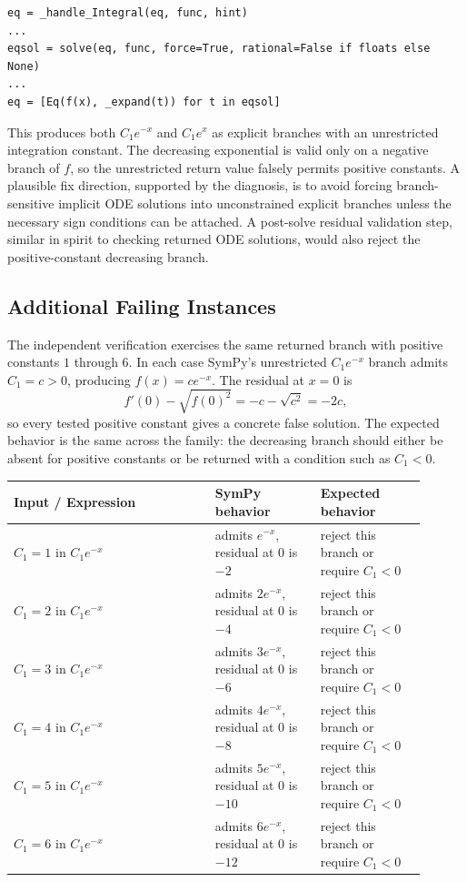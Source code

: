 \documentclass[11pt]{article}
\begin{document}
\begin{lstlisting}[style=bugpython]
eq = _handle_Integral(eq, func, hint)
...
eqsol = solve(eq, func, force=True, rational=False if floats else None)
...
eq = [Eq(f(x), _expand(t)) for t in eqsol]
\end{lstlisting}

This produces both \(C_1 e^{-x}\) and \(C_1 e^x\) as explicit branches with an
unrestricted integration constant.  The decreasing exponential is valid only on
a negative branch of \(f\), so the unrestricted return value falsely permits
positive constants.  A plausible fix direction, supported by the diagnosis, is
to avoid forcing branch-sensitive implicit ODE solutions into unconstrained
explicit branches unless the necessary sign conditions can be attached.  A
post-solve residual validation step, similar in spirit to checking returned ODE
solutions, would also reject the positive-constant decreasing branch.

\subsection{Additional Failing Instances}

The independent verification exercises the same returned branch with positive
constants \(1\) through \(6\).  In each case SymPy's unrestricted
\(C_1e^{-x}\) branch admits \(C_1=c>0\), producing \(f(x)=c e^{-x}\).  The
residual at \(x=0\) is
\[
  f'(0)-\sqrt{f(0)^2}=-c-\sqrt{c^2}=-2c,
\]
so every tested positive constant gives a concrete false solution.  The
expected behavior is the same across the family: the decreasing branch should
either be absent for positive constants or be returned with a condition such as
\(C_1<0\).

\begin{center}
\small
\renewcommand{\arraystretch}{1.3}
\begin{tabular}{@{}>{\raggedright\arraybackslash}p{0.44\linewidth}>{\raggedright\arraybackslash}p{0.23\linewidth}>{\raggedright\arraybackslash}p{0.23\linewidth}@{}}
\toprule
\textbf{Input / Expression} & \textbf{SymPy behavior} & \textbf{Expected behavior} \\
\midrule
\(C_1=1\) in \(C_1e^{-x}\) & admits \(e^{-x}\), residual at \(0\) is \(-2\) & reject this branch or require \(C_1<0\) \\
\(C_1=2\) in \(C_1e^{-x}\) & admits \(2e^{-x}\), residual at \(0\) is \(-4\) & reject this branch or require \(C_1<0\) \\
\(C_1=3\) in \(C_1e^{-x}\) & admits \(3e^{-x}\), residual at \(0\) is \(-6\) & reject this branch or require \(C_1<0\) \\
\(C_1=4\) in \(C_1e^{-x}\) & admits \(4e^{-x}\), residual at \(0\) is \(-8\) & reject this branch or require \(C_1<0\) \\
\(C_1=5\) in \(C_1e^{-x}\) & admits \(5e^{-x}\), residual at \(0\) is \(-10\) & reject this branch or require \(C_1<0\) \\
\(C_1=6\) in \(C_1e^{-x}\) & admits \(6e^{-x}\), residual at \(0\) is \(-12\) & reject this branch or require \(C_1<0\) \\
\bottomrule
\end{tabular}
\end{center}
\end{document}
